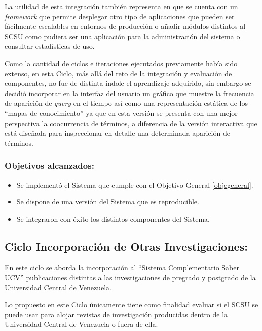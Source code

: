 \documentclass[
  12pt,
  openany]{book}
\begin{document}
La utilidad de esta integración también representa en que se cuenta con un \emph{framework} que permite desplegar otro tipo de aplicaciones que pueden ser fácilmente escalables en entornos de producción o añadir módulos distintos al SCSU como pudiera ser una aplicación para la administración del sistema o consultar estadísticas de uso.

Como la cantidad de ciclos e iteraciones ejecutados previamente había sido extenso, en esta Ciclo, más allá del reto de la integración y evaluación de componentes, no fue de distinta índole el aprendizaje adquirido, sin embargo se decidió incorporar en la interfaz del usuario un gráfico que muestre la frecuencia de aparición de \emph{query} en el tiempo así como una representación estática de los ``mapas de conocimiento'' ya que en esta versión se presenta con una mejor perspectiva la coocurrencia de términos, a diferencia de la versión interactiva que está diseñada para inspeccionar en detalle una determinada aparición de términos.

\hypertarget{objetivos-alcanzados-2}{%
\subsubsection{Objetivos alcanzados:}\label{objetivos-alcanzados-2}}

\begin{itemize}
\item
  Se implementó el Sistema que cumple con el Objetivo General \ref{objegeneral}.
\item
  Se dispone de una versión del Sistema que es reproducible.
\item
  Se integraron con éxito los distintos componentes del Sistema.
\end{itemize}

\newpage

\hypertarget{desarrollociclos6}{%
\subsection{Ciclo Incorporación de Otras Investigaciones:}\label{desarrollociclos6}}

En este ciclo se aborda la incorporación al ``Sistema Complementario Saber UCV'' publicaciones distintas a las investigaciones de pregrado y postgrado de la Universidad Central de Venezuela.

Lo propuesto en este Ciclo únicamente tiene como finalidad evaluar si el SCSU se puede usar para alojar revistas de investigación producidas dentro de la Universidad Central de Venezuela o fuera de ella.
\end{document}
